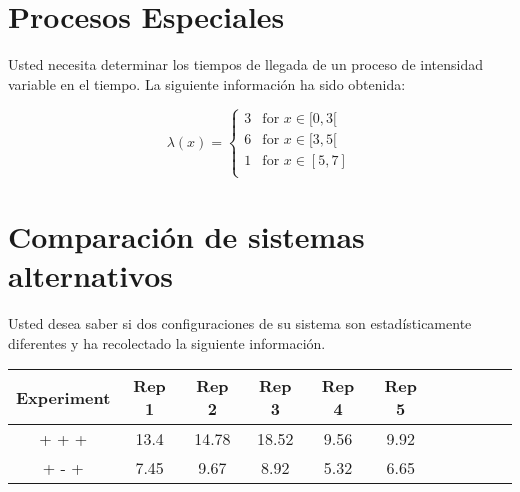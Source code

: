\documentclass[11pt]{exam}
\begin{document}
\begin{questions}
\section*{Procesos Especiales}

\question Usted necesita determinar los tiempos de llegada de un proceso de intensidad variable en el tiempo. La siguiente informaci\'on ha sido obtenida:

 \[\lambda(x)=
\begin{cases}
3&\text{for $x\in[0,3[$}\\
6&\text{for $x\in[3,5[$}\\
1&\text{for $x\in[5,7]$}\\
\end{cases}
\]


\section*{Comparaci\'on de sistemas alternativos}
\question Usted desea saber si dos configuraciones de su sistema son estad\'isticamente diferentes y ha recolectado la siguiente informaci\'on.
 \begin{table}[h!]
	\centering
    \setlength{\extrarowheight}{2pt}
    \begin{tabular}{ccccccccccc}
		\toprule
		Experiment & Rep 1& Rep 2& Rep 3& Rep 4& Rep 5\\
		\midrule
			+ + + & 13.4 & 14.78 & 18.52 & 9.56 & 9.92 \\
			+ - + & 7.45 & 9.67 & 8.92 & 5.32 & 6.65 \\
		\bottomrule
    \end{tabular}
  \end{table}
\end{questions}
\end{document}

